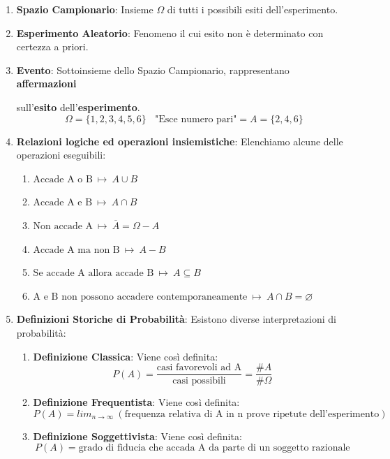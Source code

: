 \documentclass{article}
\begin{document}
\begin{enumerate}
    \item \textbf{Spazio Campionario}: Insieme $\Omega$ di tutti i possibili esiti dell'esperimento.
    \item \textbf{Esperimento Aleatorio}: Fenomeno il cui esito non è determinato con certezza a priori.
    \item \textbf{Evento}: Sottoinsieme dello Spazio Campionario, rappresentano \textbf{affermazioni} 
    
    sull'\textbf{esito} dell'\textbf{esperimento}.
    \[ \Omega = \{ 1,2,3,4,5,6 \} \: \: \: \: \text{"Esce numero pari"} = A = \{ 2,4,6 \} \]
    \item \textbf{Relazioni logiche ed operazioni insiemistiche}: Elenchiamo alcune delle operazioni eseguibili:
    \begin{enumerate}
        \item $\text{Accade A o B} \: \mapsto \: A \cup B$
        \item $\text{Accade A e B} \: \mapsto \: A \cap B$
        \item $\text{Non accade A} \: \mapsto \: \overline{A} = \Omega - A$
        \item $\text{Accade A ma non B} \: \mapsto \: A - B$
        \item $\text{Se accade A allora accade B} \: \mapsto \: A \subseteq B$
        \item $\text{A e B non possono accadere contemporaneamente} \: \mapsto \: A \cap B = \varnothing$ 
    \end{enumerate}
    \item \textbf{Definizioni Storiche di Probabilità}: Esistono diverse interpretazioni di probabilità:
    \begin{enumerate}
        \item \textbf{Definizione Classica}: Viene così definita:
        \[ P(A) = \frac{\text{casi favorevoli ad A}}{\text{casi possibili}} = \frac{\#A}{\#\Omega} \]
        \item \textbf{Definizione Frequentista}: Viene così definita:
        \[ P(A) = lim_{n\rightarrow\infty} \: (\text{frequenza relativa di A in n prove ripetute dell'esperimento}) \]
        \item \textbf{Definizione Soggettivista}: Viene così definita:
        \[ P(A) = \text{grado di fiducia che accada A da parte di un soggetto razionale} \]
    \end{enumerate}
\end{enumerate}
\end{document}
